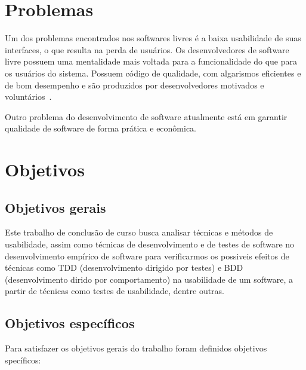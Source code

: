 \section{Problemas}

Um dos problemas encontrados nos softwares livres é a baixa usabilidade de suas interfaces, o que resulta na perda de usuários. 
%
Os desenvolvedores de software livre possuem uma mentalidade mais voltada para a funcionalidade do que para os usuários do sistema. Possuem código de qualidade, com algarismos eficientes e de bom desempenho e são produzidos por desenvolvedores motivados e voluntários~\cite{santos2012}. 

Outro problema do desenvolvimento de software atualmente está em garantir qualidade de software de forma prática e econômica.


\section{Objetivos}

\subsection{Objetivos gerais}
	 
Este trabalho de conclusão de curso busca analisar técnicas e métodos de usabilidade, assim como técnicas de desenvolvimento e de testes de software no desenvolvimento empírico de software para verificarmos os possiveis efeitos de técnicas como TDD (desenvolvimento dirigido por testes) e BDD (desenvolvimento dirido por comportamento) na usabilidade de um software, a partir de técnicas como testes de usabilidade, dentre outras.
	 
	 
\subsection{Objetivos específicos}

Para satisfazer os objetivos gerais do trabalho foram definidos objetivos specíficos:

